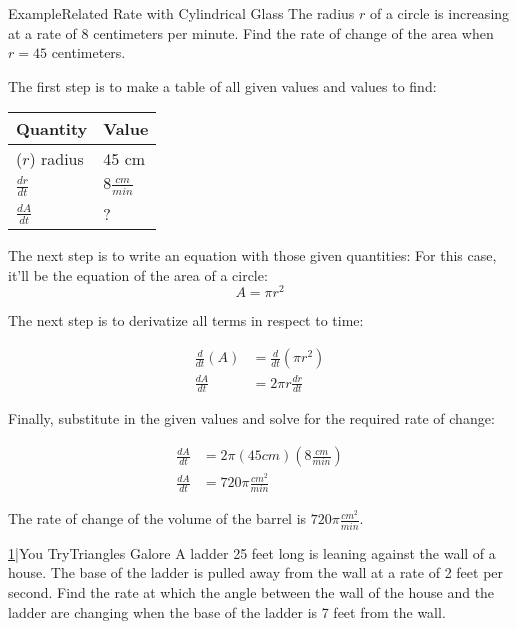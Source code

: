 \documentclass{MathNotes}
\newenvironment{example}[1]{\begin{BlueBox}{Example}{#1}}{\end{BlueBox}}
\newenvironment{practice}[2]{\begin{PurpleBox}{\texorpdfstring{#1}\Big|You Try}{#2}}{\end{PurpleBox}}
\begin{document}
\begin{example}{Related Rate with Cylindrical Glass}\label{ex:related-rates}
	The radius $r$ of a circle is increasing at a rate of 8 centimeters per
	minute. Find the rate of change of the area when $r = 45$ centimeters.

	The first step is to make a table of all given values and values to find:
	\begin{center}
		\begin{tabular}{l|l}
			Quantity        & Value             \\
			\hline
			($r$) radius    & 45 cm             \\
			$\frac{dr}{dt}$ & $8\frac{cm}{min}$ \\
			$\frac{dA}{dt}$ & ?                 \\
		\end{tabular}
	\end{center}

	The next step is to write an equation with those given quantities: For this
	case, it'll be the equation of the area of a circle: $$A=\pi r^2$$

	The next step is to derivatize all terms in respect to time:

	\begin{align*}
		\frac{d}{dt}(A) & =\frac{d}{dt}(\pi r^2) \\
		\frac{dA}{dt}   & =2\pi r\frac{dr}{dt}
	\end{align*}

	Finally, substitute in the given values and solve for the required rate
	of change:

	\begin{align*}
		\frac{dA}{dt} & =2\pi (45cm)(8\frac{cm}{min}) \\
		\frac{dA}{dt} & =720\pi\frac{cm^2}{min}
	\end{align*}

	The rate of change of the volume of the barrel is $720\pi\frac{cm^2}{min}$.
\end{example}

\begin{practice}{\hyperref[ans:related-rates]{1}}{Triangles Galore}\label{prac:related-rates}
	A ladder 25 feet long is leaning against the wall of a house. The base
	of the ladder is pulled away from the wall at a rate of 2 feet per
	second. Find the rate at which the angle between the wall of the house and the
	ladder are changing when the base of the ladder is 7 feet from the wall.
\end{practice}
\end{document}
